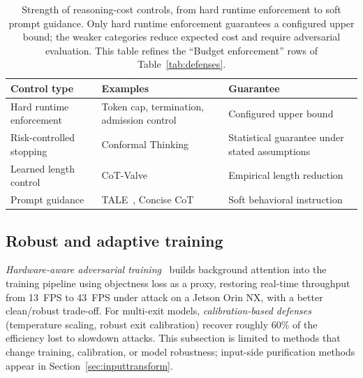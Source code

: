\documentclass[acmsmall,screen,review,nonacm]{acmart}
\begin{document}
\begin{table}[htbp]
  \caption{Strength of reasoning-cost controls, from hard runtime enforcement to soft prompt guidance. Only hard runtime enforcement guarantees a configured upper bound; the weaker categories reduce expected cost and require adversarial evaluation. This table refines the ``Budget enforcement'' rows of Table~\ref{tab:defenses}.}
  \label{tab:control-strength}
  \footnotesize
  \setlength{\tabcolsep}{5pt}
  \begin{tabularx}{\linewidth}{L{3.1cm} L{3.3cm} X}
    \toprule
    \textbf{Control type} & \textbf{Examples} & \textbf{Guarantee} \\
    \midrule
    Hard runtime enforcement & Token cap, termination, admission control~\cite{zhang2025pd3f,chen2026tokenbudget} & Configured upper bound \\
    \addlinespace
    Risk-controlled stopping & Conformal Thinking~\cite{wang2026conformal} & Statistical guarantee under stated assumptions \\
    \addlinespace
    Learned length control & CoT-Valve~\cite{ma2025cotvalve} & Empirical length reduction \\
    \addlinespace
    Prompt guidance & TALE~\cite{han2024tale}, Concise CoT~\cite{renze2024ccot} & Soft behavioral instruction \\
    \bottomrule
  \end{tabularx}
\end{table}

\subsection{Robust and adaptive training}
\emph{Hardware-aware adversarial training}~\cite{wang2025cantslow} builds background attention into the training pipeline using objectness loss as a proxy, restoring real-time throughput from 13~FPS to 43~FPS under attack on a Jetson Orin NX, with a better clean/robust trade-off. For multi-exit models, \emph{calibration-based defenses}~\cite{varma2024slowdown} (temperature scaling, robust exit calibration) recover roughly 60\% of the efficiency lost to slowdown attacks. This subsection is limited to methods that change training, calibration, or model robustness; input-side purification methods appear in Section~\ref{sec:inputtransform}.
\end{document}
